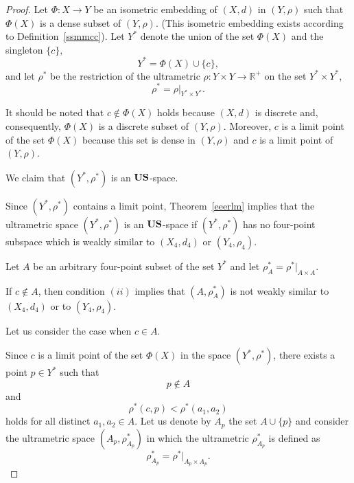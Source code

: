 \documentclass[11pt]{article}
\theoremstyle{definition}
\theoremstyle{remark}
\numberwithin{equation}{section}
\begin{document}
\begin{proof}
 Let $\Phi \colon X \to Y$ be an isometric embedding of
$(X,d)$ in $(Y,\rho)$ such that $\Phi(X)$ is a dense
subset of $(Y,\rho)$.
(This isometric embedding exists according to
Definition~\ref{ssmmcc}).
Let $Y^*$ denote the union of the set $\Phi(X)$
and the singleton $\{c\}$,
\[
Y^* = \Phi(X) \cup \{c\},
\]
and let $\rho^*$ be the restriction
of the ultrametric $\rho : Y \times Y \to \mathbb{R}^+$
on the set $Y^* \times Y^*$,
\[
\rho^* = \rho|_{Y^* \times Y^*}.
\]




It should be noted that $c \notin \Phi(X)$ holds because $(X,d)$ is discrete and, consequently, $\Phi(X)$ is a discrete subset of $(Y,\rho)$. Moreover, $c$ is a limit point of the set $\Phi(X)$ because this set is dense in $(Y,\rho)$ and $c$ is a limit point of $(Y,\rho)$. 








We claim that $(Y^*, \rho^*)$ is an $\bf{US}$-space.


Since $(Y^*, \rho^*)$ contains a limit point,  Theorem~\ref{eeerlm} implies that the ultrametric space $(Y^*, \rho^*)$ is an 
${\bf US}$-space if $(Y^*, \rho^*)$ has no four-point subspace which
is weakly similar to $(X_{4}, d_4)$ or $(Y_4, \rho_4)$. 
 


Let $A$ be an arbitrary four-point subset of the set $Y^*$ and let $\rho^*_A = \rho^*|_{A \times A}$. 

If $c\notin A$, then condition $(ii)$ implies that $(A,\rho^*_A)$ is not weakly similar to $(X_4,d_4)$ or to $(Y_4,\rho_4)$.

Let us consider the case when $c\in A$.

Since \(c\) is a limit point of the set \(\Phi(X)\) in the space \((Y^*, \rho^*)\), 
there exists a point \(p \in Y^*\) such that 
\begin{equation}
    \label{thkq2}
p \notin A 
\end{equation}
and 
\begin{equation}
    \label{thkq21}
\rho^*(c,p) <  \rho^*(a_1,a_2)
\end{equation}
holds for all distinct $a_1,a_2\in A$.
Let us denote by \(A_p\) the set \(A \cup \{p\}\) and consider the ultrametric space
\((A_p, \rho^*_{A_p})\) in which the ultrametric \(\rho^*_{A_p}\) is defined as
\[
\rho^*_{A_p} = \rho^* \big|_{A_p \times A_p}.
\]





\end{proof}
\end{document}
